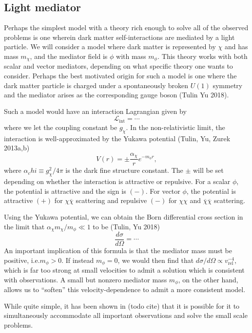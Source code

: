 \hypertarget{light-mediator}{%
\subsection{Light mediator}\label{light-mediator}}

Perhaps the simplest model with a theory rich enough to solve all of the
observed problems is one wherein dark matter self-interactions are
mediated by a light particle. We will consider a model where dark matter
is represented by \(\chi\) and has mass \(m_\chi\), and the mediator
field is \(\phi\) with mass \(m_\phi\). This theory works with both
scalar and vector mediators, depending on what specific theory one wants
to consider. Perhaps the best motivated origin for such a model is one
where the dark matter particle is charged under a spontaneously broken
\(U(1)\) symmetry and the mediator arises as the corresponding gauge
boson (Tulin Yu 2018).

Such a model would have an interaction Lagrangian given by
\[ \mathcal{L}_{\text{int}} = \cdots \] where we let the coupling
constant be \(g_\chi\). In the non-relativistic limit, the interaction
is well-approximated by the Yukawa potential (Tulin, Yu, Zurek 2013a,b)
\[ V(r) = \pm \frac{\alpha_\chi}{r} e^{-m_\phi r}, \] where
\(\alpha_chi \equiv g_\chi^2/4\pi\) is the dark fine structure constant.
The \(\pm\) will be set depending on whether the interaction is
attractive or repulsive. For a scalar \(\phi\), the potential is
attractive and the sign is \((-)\). For vector \(\phi\), the potential
is attractive \((+)\) for \(\chi\overline{\chi}\) scattering and
repulsive \((-)\) for \(\chi\chi\) and
\(\overline{\chi}\overline{\chi}\) scattering.

Using the Yukawa potential, we can obtain the Born differential cross
section in the limit that \(\alpha_\chi m_\chi / m_\phi \ll 1\) to be
(Tulin, Yu 2018) \[ \frac{d\sigma}{d\Omega} = \cdots \] An important
implication of this formula is that the mediator mass must be positive,
i.e.\(m_\phi > 0\). If instead \(m_\phi = 0\), we would then find that
\( d\sigma/d\Omega \propto v_{\text{rel}}^{-4}\), which is far
too strong at small velocities to admit a solution which is consistent
with observations. A small but nonzero mediator mass \(m_\phi\), on the
other hand, allows us to ``soften'' this velocity-dependence to admit a
more consistent model.

While quite simple, it has been shown in (todo cite) that it is possible
for it to simultaneously accommodate all important observations and
solve the small scale problems.

